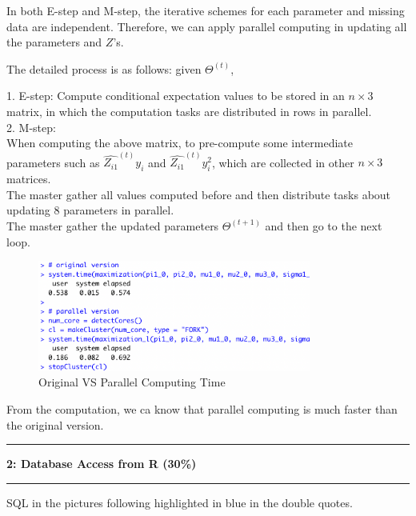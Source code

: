 \documentclass[11pt]{article}
\newcommand\question[2]{\vspace{.25in}\hrule\textbf{#1: #2}\vspace{.5em}\hrule\vspace{.10in}}
\begin{document}
In both E-step and M-step, the iterative schemes for each parameter and missing data are independent. Therefore, we can apply parallel computing 
in updating all the parameters and $Z$'s.

The detailed process is as follows: given $\Theta^{(t)}$,

1. E-step: Compute conditional expectation values to be stored in an $n \times 3$ matrix, in which the computation tasks are distributed in rows in parallel.\\
2. M-step: \\
When computing the above matrix, to pre-compute some intermediate parameters such as $\widehat{Z_{i1}}^{(t)} y_i$ and $\widehat{Z_{i1}}^{(t)} y_i^2$, which are collected in other $n \times 3$ matrices.\\
The master gather all values computed before and then distribute tasks about updating 8 parameters in parallel.\\
The master gather the updated parameters $\Theta^{(t+1)}$ and then go to the next loop.
\begin{figure}[H]
    \centering
    \includegraphics[width=0.8\textwidth]{figures/Q1.png}
    \caption{Original VS Parallel Computing Time}
\end{figure}
From the computation, we ca know that parallel computing is much faster than the original version. 

\question{2}{Database Access from R (30\%)}
SQL in the pictures following highlighted in blue in the double quotes.
\end{document}
